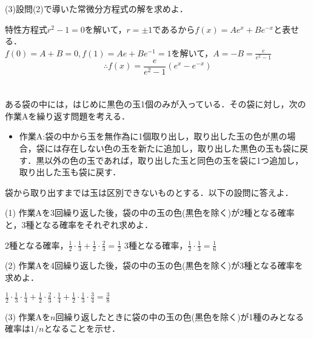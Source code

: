 \documentclass[a4j]{jarticle}
\let \ds \displaystyle
\begin{document}
\begin{screen}
 (3)設問(2)で導いた常微分方程式の解を求めよ．
\end{screen}

特性方程式$r^2-1=0$を解いて，$r=\pm 1$であるから$f(x)=Ae^x + Be^{-x}$と表せる．\\
$f(0)=A+B=0,f(1)=Ae + Be^{-1}=1$を解いて，$\ds A=-B=\frac{e}{e^2-1}$
$$\therefore f(x)=\frac{e}{e^2-1}(e^x-e^{-x})$$

\section{}

\begin{screen}
 ある袋の中には，はじめに黒色の玉1個のみが入っている．その袋に対し，次の作業Aを繰り返す問題を考える．
 
\begin{itemize}
 \item[]作業A:袋の中から玉を無作為に1個取り出し，取り出した玉の色が黒の場合，袋には存在しない色の玉を新たに追加し，取り出した黒色の玉も袋に戻す．黒以外の色の玉であれば，取り出した玉と同色の玉を袋に1つ追加し，取り出した玉も袋に戻す．
\end{itemize}

 袋から取り出すまでは玉は区別できないものとする．以下の設問に答えよ．
\end{screen}

\begin{screen}
 (1) 作業Aを3回繰り返した後，袋の中の玉の色(黒色を除く)が2種となる確率と，3種となる確率をそれぞれ求めよ．
\end{screen}

2種となる確率，$\ds \frac{1}{2}\cdot\frac{1}{3} + \frac{1}{2}\cdot\frac{2}{3} = \frac{1}{2}$ 3種となる確率，$\ds \frac{1}{2}\cdot\frac{1}{3}=\frac{1}{6}$

\begin{screen}
 (2) 作業Aを4回繰り返した後，袋の中の玉の色(黒色を除く)が3種となる確率を求めよ．
\end{screen}

$\ds \frac{1}{2}\cdot\frac{1}{3}\cdot\frac{1}{4}+\frac{1}{2}\cdot\frac{2}{3}\cdot\frac{1}{4}+\frac{1}{2}\cdot\frac{1}{3}\cdot\frac{3}{4} = \frac{3}{8}$

\begin{screen}
 (3) 作業Aを$n$回繰り返したときに袋の中の玉の色(黒色を除く)が1種のみとなる確率は$1/n$となることを示せ．
\end{screen}
\end{document}
